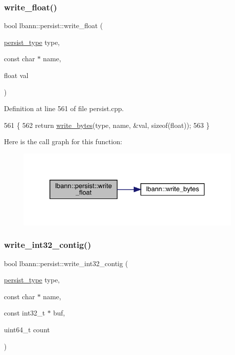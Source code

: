\subsubsection{\texorpdfstring{write\+\_\+float()}{write\_float()}}
{\footnotesize\ttfamily bool lbann\+::persist\+::write\+\_\+float (\begin{DoxyParamCaption}\item[{\hyperlink{namespacelbann_adee41f31f15f3906cbdcce4a1417eb56}{persist\+\_\+type}}]{type,  }\item[{const char $\ast$}]{name,  }\item[{float}]{val }\end{DoxyParamCaption})}



Definition at line 561 of file persist.\+cpp.


\begin{DoxyCode}
561                                                                              \{
562   \textcolor{keywordflow}{return} \hyperlink{classlbann_1_1persist_a8729c7c90f4ca3090cd678fce91a0eb0}{write\_bytes}(type, name, &val, \textcolor{keyword}{sizeof}(\textcolor{keywordtype}{float}));
563 \}
\end{DoxyCode}
Here is the call graph for this function\+:\nopagebreak
\begin{figure}[H]
\begin{center}
\leavevmode
\includegraphics[width=315pt]{classlbann_1_1persist_ab5be1e98f9d962c41fc9c3f2ac918c6e_cgraph}
\end{center}
\end{figure}
\mbox{\label{classlbann_1_1persist_a199cd86b1e1f0fd5f2d0458fc6d25828}} 
\subsubsection{\texorpdfstring{write\+\_\+int32\+\_\+contig()}{write\_int32\_contig()}}
{\footnotesize\ttfamily bool lbann\+::persist\+::write\+\_\+int32\+\_\+contig (\begin{DoxyParamCaption}\item[{\hyperlink{namespacelbann_adee41f31f15f3906cbdcce4a1417eb56}{persist\+\_\+type}}]{type,  }\item[{const char $\ast$}]{name,  }\item[{const int32\+\_\+t $\ast$}]{buf,  }\item[{uint64\+\_\+t}]{count }\end{DoxyParamCaption})}




